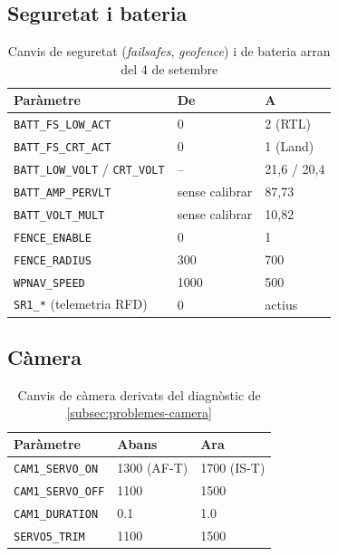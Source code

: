 \subsection{Seguretat i bateria}

\begin{table}[H]
    \centering
    \caption{Canvis de seguretat (\emph{failsafes}, \emph{geofence}) i de bateria arran del 4 de setembre}
    \label{tab:canvis-seguretat}
    \begin{tabular}{lll}
        \toprule
        Paràmetre & De & A \\
        \midrule
        \texttt{BATT\_FS\_LOW\_ACT} & 0 & 2 (RTL) \\
        \texttt{BATT\_FS\_CRT\_ACT} & 0 & 1 (Land) \\
        \texttt{BATT\_LOW\_VOLT} / \texttt{CRT\_VOLT} & -- & 21,6 / 20,4 \\
        \texttt{BATT\_AMP\_PERVLT} & sense calibrar & 87,73 \\
        \texttt{BATT\_VOLT\_MULT} & sense calibrar & 10,82 \\
        \texttt{FENCE\_ENABLE} & 0 & 1 \\
        \texttt{FENCE\_RADIUS} & 300 & 700 \\
        \texttt{WPNAV\_SPEED} & 1000 & 500 \\
        \texttt{SR1\_*} (telemetria RFD) & 0 & actius \\
        \bottomrule
    \end{tabular}
\end{table}

\subsection{Càmera}
\label{subsec:canvis-camera-pendents}

\begin{table}[H]
    \centering
    \caption{Canvis de càmera derivats del diagnòstic de \cref{subsec:problemes-camera}}
    \label{tab:canvis-camera}
    \begin{tabular}{lll}
        \toprule
        Paràmetre & Abans & Ara \\
        \midrule
        \texttt{CAM1\_SERVO\_ON} & 1300 (AF-T) & 1700 (IS-T) \\
        \texttt{CAM1\_SERVO\_OFF} & 1100 & 1500 \\
        \texttt{CAM1\_DURATION} & 0.1 & 1.0 \\
        \texttt{SERVO5\_TRIM} & 1100 & 1500 \\
        \bottomrule
    \end{tabular}
\end{table}

